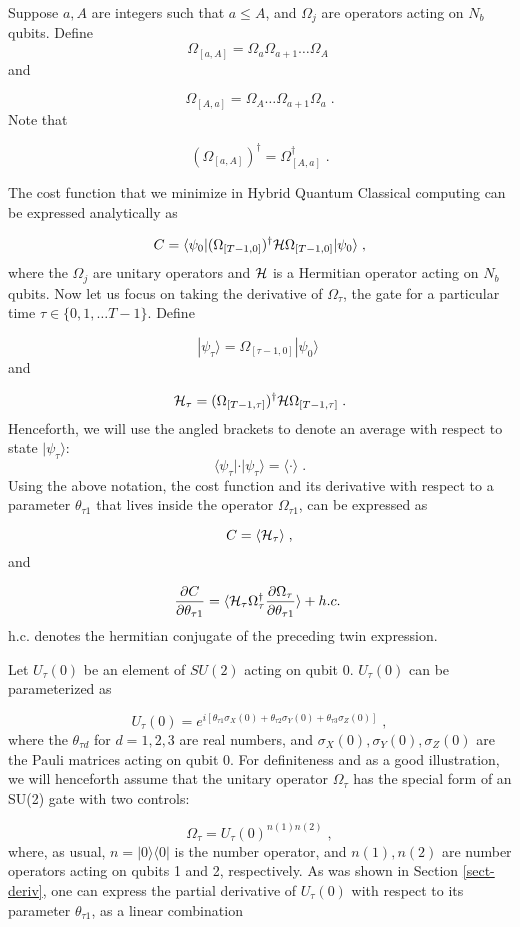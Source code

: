 \documentclass[12pt]{article}
\newcommand{\bra}[1]{\langle#1|}
\newcommand{\ket}[1]{|#1\rangle}
\newcommand{\beq}{\begin{equation}}
\newcommand{\eeq}{\end{equation}}
\newcommand{\hh}{{\cal H}}
\begin{document}
{Suppose $a, A$ are integers such that $a\leq A$,
and $\Omega_j$ are operators acting on $N_b$ qubits.
Define
\beq
\Omega_{[a,A]} = \Omega_a \Omega_{a+1}\ldots \Omega_{A}
\;
\eeq
and

\beq
\Omega_{[A,a]} = \Omega_A\ldots \Omega_{a+1} \Omega_{a}
\;.
\eeq
Note that

\beq
(\Omega_{[a, A]})^\dagger = \Omega^\dagger_{[A,a]}
\;.
\eeq

The cost function that we minimize
in Hybrid Quantum Classical computing
 can be expressed analytically as

\beq C = \bra{\psi_0}(\Omega_{[T-1,0]})^\dagger \hh
\Omega_{[T-1,0]}\ket{\psi_0}
\;,
\label{eq_q_cost_fun}
\eeq
where the $\Omega_j$ are unitary operators
and $\hh$ is a Hermitian operator
acting on $N_b$ qubits. Now let us
focus on
taking the derivative of $\Omega_\tau$, the gate for a particular time
$\tau \in \{0,1, \ldots T-1\}$. Define

\beq
\ket{\psi_\tau} = \Omega_{[\tau-1, 0]}\ket{\psi_0}
\;
\eeq
and

\beq
\hh_\tau = (\Omega_{[T-1,\tau]})^\dagger \hh \Omega_{[T-1,\tau]}
\;.
\eeq
Henceforth,
we will
use the angled brackets to
 denote an average with respect to
state $\ket{\psi_\tau}$:
\beq
\bra{\psi_\tau}\cdot\ket{\psi_\tau}
=
\langle \cdot\rangle
\;.
\eeq
Using the above notation, the
cost function and its derivative
with respect to a parameter $\theta_{\tau 1}$
that lives inside the operator $\Omega_{\tau 1}$,
can be expressed as

\beq
C = \langle \hh_\tau\rangle
\;,
\eeq
and


\beq
\frac{\partial C}{\partial\theta_{\tau 1}}
=
\langle \hh_\tau
\Omega_\tau^\dagger
\frac{\partial \Omega_\tau}{\partial\theta_{\tau 1}}
\rangle
+ h.c.
\;
\label{derv_cost1}
\eeq
h.c. denotes the hermitian conjugate
of the preceding twin expression.

Let $U_{\tau}(0)$
be an element of $SU(2)$ acting on qubit 0.
$U_{\tau}(0)$ can be parameterized as


\beq
U_{\tau}(0)=
e^{i[\theta_{\tau 1}\sigma_X(0)
+
\theta_{\tau 2}\sigma_Y(0)
+
\theta_{\tau 3}\sigma_Z(0)]}
\;,
\eeq
where the $\theta_{\tau d}$ for $d=1,2,3$
are real numbers,
and $\sigma_X(0), \sigma_Y(0), \sigma_Z(0)$
are
the Pauli matrices acting on qubit 0.
For definiteness and as a good illustration,
we will henceforth assume that the
unitary operator $\Omega_\tau$
has the special form
of an SU(2) gate with two controls:

\beq
\Omega_{\tau}=
U_{\tau}(0)^{n(1)n(2)}
\;,
\label{special_omega_tau}
\eeq
where, as usual, $n=\ket{0}\bra{0}$
is the number operator, and $n(1), n(2)$
are number operators acting on qubits 1 and 2,
respectively.
As was shown in Section \ref{sect-deriv},
one can express the partial derivative of
$U_{\tau}(0)$ with respect
 to its parameter $\theta_{\tau 1}$,
as a linear combination


}
\end{document}
